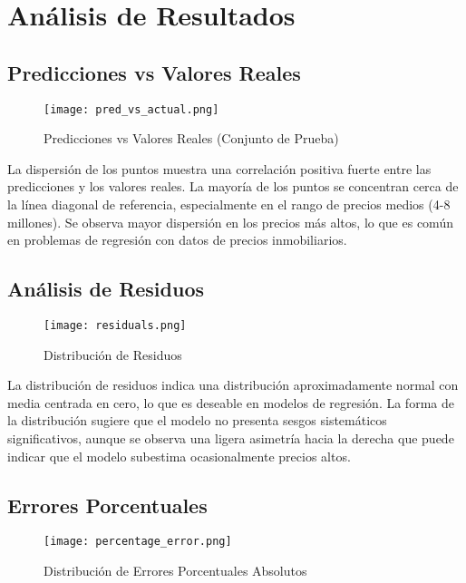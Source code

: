 \documentclass[11pt,a4paper]{article}
\begin{document}
\section{Análisis de Resultados}

\subsection{Predicciones vs Valores Reales}

\begin{figure}[H]
    \centering
    \texttt{[image: pred\_vs\_actual.png]}
    \caption{Predicciones vs Valores Reales (Conjunto de Prueba)}
    \label{fig:pred_vs_actual}
\end{figure}

La dispersión de los puntos muestra una correlación positiva fuerte entre las predicciones y los valores reales. La mayoría de los puntos se concentran cerca de la línea diagonal de referencia, especialmente en el rango de precios medios (4-8 millones). Se observa mayor dispersión en los precios más altos, lo que es común en problemas de regresión con datos de precios inmobiliarios.

\subsection{Análisis de Residuos}

\begin{figure}[H]
    \centering
    \texttt{[image: residuals.png]}
    \caption{Distribución de Residuos}
    \label{fig:residuals}
\end{figure}

La distribución de residuos indica una distribución aproximadamente normal con media centrada en cero, lo que es deseable en modelos de regresión. La forma de la distribución sugiere que el modelo no presenta sesgos sistemáticos significativos, aunque se observa una ligera asimetría hacia la derecha que puede indicar que el modelo subestima ocasionalmente precios altos.

\subsection{Errores Porcentuales}

\begin{figure}[H]
    \centering
    \texttt{[image: percentage\_error.png]}
    \caption{Distribución de Errores Porcentuales Absolutos}
    \label{fig:percentage_error}
\end{figure}
\end{document}
